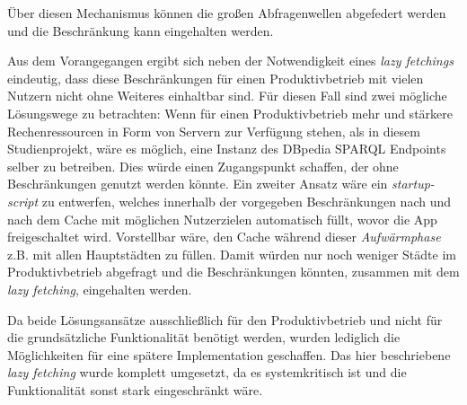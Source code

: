 	Über diesen Mechanismus können die großen Abfragenwellen abgefedert werden und die Beschränkung kann eingehalten werden.
	
	\vspace{0.25cm}
	
	Aus dem Vorangegangen ergibt sich neben der Notwendigkeit eines \textit{lazy fetchings} eindeutig, dass diese Beschränkungen für einen Produktivbetrieb mit vielen Nutzern nicht ohne Weiteres einhaltbar sind. Für diesen Fall sind zwei mögliche Lösungswege zu betrachten: Wenn für einen Produktivbetrieb mehr und stärkere Rechenressourcen in Form von Servern zur Verfügung stehen, als in diesem Studienprojekt, wäre es möglich, eine Instanz des DBpedia SPARQL Endpoints selber zu betreiben. Dies würde einen Zugangspunkt schaffen, der ohne Beschränkungen genutzt werden könnte. Ein zweiter Ansatz wäre ein \textit{startup-script} zu entwerfen, welches innerhalb der vorgegeben Beschränkungen nach und nach dem Cache mit möglichen Nutzerzielen automatisch füllt, wovor die App freigeschaltet wird. Vorstellbar wäre, den Cache während dieser \textit{Aufwärmphase} z.B. mit allen Hauptstädten zu füllen. Damit würden nur noch weniger Städte im Produktivbetrieb abgefragt und die Beschränkungen könnten, zusammen mit dem \textit{lazy fetching}, eingehalten werden.
	
	\vspace{0.25cm}
	
	Da beide Lösungsansätze ausschließlich für den Produktivbetrieb und nicht für die grundsätzliche Funktionalität benötigt werden, wurden lediglich die Möglichkeiten für eine spätere Implementation geschaffen. Das hier beschriebene \textit{lazy fetching} wurde komplett umgesetzt, da es systemkritisch ist und die Funktionalität sonst stark eingeschränkt wäre.      